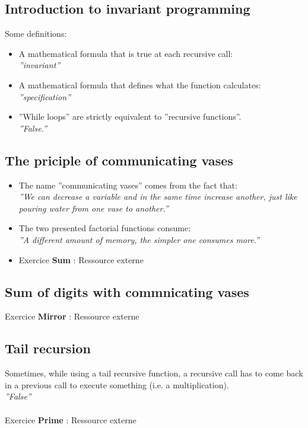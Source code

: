 \documentclass[fr,license=none]{../../../eplsummary}
\begin{document}
		\subsection{Introduction to invariant programming}
			Some definitions:
			\begin{itemize}
				\item A mathematical formula that is true at each recursive call:\\
					\textit{''invariant''}
				\item A mathematical formula that defines what the function calculates:\\
					\textit{''specification''}
				\item ''While loops'' are strictly equivalent to ''recursive functions''.\\
					\textit{''False.''}
			\end{itemize}
		\subsection{The priciple of communicating vases}
			\begin{itemize}
				\item The name ''communicating vases'' comes from the fact that:\\
					\textit{''We can decrease a variable and in the same time increase another, just like pouring water from one vase to another.''}
				\item The two presented factorial functions consume:\\
					\textit{''A different amount of memory, the simpler one consumes more.''}
				\item Exercice \textbf{Sum} : Ressource externe\\
				
			\end{itemize}
		\subsection{Sum of digits with commnicating vases}
			Exercice \textbf{Mirror} : Ressource externe\\
			
		\subsection{Tail recursion}
			Sometimes, while using a tail recursive function, a recursive call has to come back in a previous call to execute something (i.e. a multiplication).\\
			\textit{''False''}\\\\
			Exercice \textbf{Prime} : Ressource externe\\
			
\end{document}
